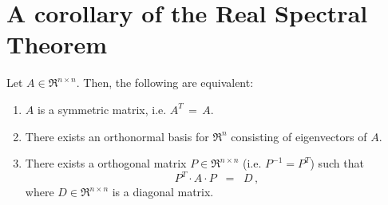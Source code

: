 

\section{A corollary of the Real Spectral Theorem}
\setcounter{theorem}{0}
\setcounter{equation}{0}

\renewcommand{\theenumi}{\roman{enumi}}
\renewcommand{\labelenumi}{\textnormal{(\theenumi)}$\;\;$}


\begin{theorem}
\label{RealSpectralTheorem}
\mbox{}\vskip 0.1cm\noindent
Let $A \in \Re^{n \times n}$. Then, the following are equivalent:
\begin{enumerate}
\item
	$A$ is a symmetric matrix, i.e. $A^{T} \,=\, A$.
\item
	There exists an orthonormal basis for $\Re^{n}$ consisting of eigenvectors of $A$.
\item
	There exists a orthogonal matrix $P \in \Re^{n \times n}$ (i.e. $P^{-1} = P^{T}$) such that
	\begin{equation*}
	P^{T} \cdot A \cdot P \;\; = \;\; D\,,
	\end{equation*}
	where $D \in \Re^{n \times n}$ is a diagonal matrix.
\end{enumerate}
\end{theorem}

